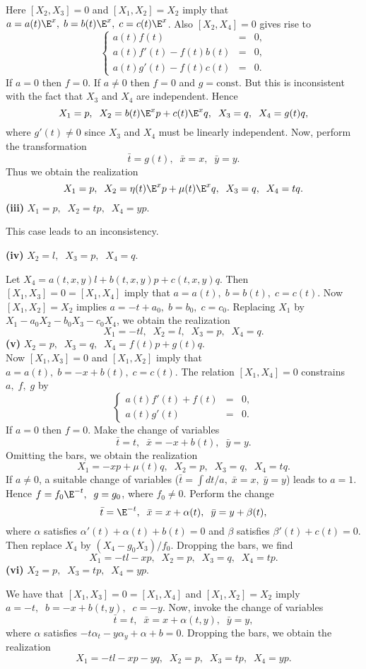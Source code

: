 Here $[X_2,X_3]=0 $  and
$[X_1,X_2]=X_2$ imply that $ a=a(t)\E^x,\;b=b(t)\E^x,\;c=c(t)\E^x$. Also
$[X_2,X_4]=0$ gives rise to \[\left \{ \begin{array}{lll} a(t)f(t) & =
& 0, \\ a(t)f'(t)-f(t)b(t) & = & 0,\\ a(t)g'(t)-f(t)c(t) & = & 0.
\end{array} \right.\] If $a=0$ then $f=0$. If $a\ne 0$ then $f=0$ and
$g=\mbox{const}$. But this is inconsistent with the fact that $X_3$ and
$X_4$ are independent. Hence
\[X_1=p,\;\;X_2=b(t)\E^xp+c(t)\E^xq,\;\;X_3=q,\;\; X_4=g(t)q,\] where
$g'(t)\ne 0$ since $X_3$ and $X_4$ must be linearly independent. Now,
perform the transformation \[\bar t= g(t),\;\;\bar x=x, \;\;\bar
y=y.\] Thus we obtain the realization \[X_1=p,\;\;X_2=\eta (t)\E^xp+\mu
(t) \E^xq,\;\; X_3=q,\;\;X_4=tq.\]
{\bf (iii)}
$X_1=p,\;\;X_2=tp,\;\;X_4=yp.$

This case leads to an inconsistency.

{\bf (iv)} $X_2=l,\;\;X_3=p,\;\;X_4=q.$

Let $X_4=a(t,x,y)l+b(t,x,y)p+c(t,x,y)q$. Then $[X_1,X_3]=0=[X_1,X_4]$ imply
that $a=a(t),\;b=b(t),\;c=c(t)$. Now $[X_1,X_2]=X_2$ implies
$a=-t+a_0,\;b=b_0,\; c=c_0$. Replacing $X_1$ by
$X_1-a_0X_2-b_0X_3-c_0X_4$, we obtain the realization
\[X_1=-tl,\;\;X_2=l,\;\;X_3=p,\;\;X_4=q.\] {\bf (v)}
$X_2=p,\;\;X_3=q,\;\;X_4=f(t)p+g(t)q.$\\ Now $[X_1,X_3]=0$ and $[X_1,X_2]$
imply that $ a=a(t),\;b=-x+b(t),\;c=c(t)$. The relation $[X_1,X_4]=0$
constrains
$a,\;f,\;g$ by \[\left \{ \begin{array}{lll} a(t)f'(t)+f(t) & = & 0,\\
a(t)g'(t) & =& 0. \end{array} \right. \] If $a=0$ then $f=0$. Make the
change of variables \[\bar t=t,\;\;\bar x =-x+b(t),\;\; \bar y=y.\]
Omitting the bars, we obtain the realization \[X_1=-xp+\mu
(t)q,\;\;X_2=p,\;\;X_3=q,\;\;X_4=tq.\] If $a\ne 0$, a suitable change of
variables ($\bar t=\int dt/a,\;\bar x=x,\; \bar y =y$) leads to $a=1$.
Hence $f=f_0\E^{-t},\;\;g=g_0$, where $f_0\ne 0$. Perform the change 
\[ \bar t= \E^{-t},\;\;\bar x=x+\alpha (t),\;\; \bar y=y+\beta
(t),\] where  $\alpha$ satisfies $\alpha '(t)+\alpha(t)+b(t)=0$ and
$\beta$ satisfies $\beta '(t)+c(t)=0$. Then replace $X_4$ by
$(X_4-g_0X_3)/f_0$. Dropping the bars, we find
\[X_1=-tl-xp,\;\;X_2=p,\;\;X_3=q,\;\;X_4=tp.\]
{\bf (vi)}
$X_2=p,\;\;X_3=tp,\;\;X_4=yp.$

We have that $[X_1,X_3]=0=[X_1,X_4]$ and
$[X_1,X_2]=X_2$ imply  $a=-t,\;\;b=-x+b(t,y),\;\;c=-y$. Now, invoke the
change of variables \[\bar t=t,\;\;\bar x=x+\alpha (t,y),\;\;\bar y=y,\]
where  $\alpha$ satisfies $-t\alpha_t-y\alpha_y+\alpha+b=0$. Dropping the
bars, we obtain the realization
\[X_1=-tl-xp-yq,\;\;X_2=p,\;\;X_3=tp,\;\;X_4=yp.\]

